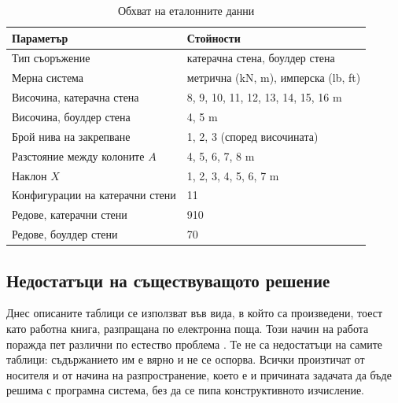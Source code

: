 \begin{table}[htbp]
\centering
\caption{Обхват на еталонните данни}
\label{tab:params}
{\fontsize{10}{12}\selectfont
\begin{tabular}{@{}L{5.6cm}L{7.4cm}@{}}
\toprule
\textbf{Параметър} & \textbf{Стойности} \\
\midrule
Тип съоръжение & катерачна стена, боулдер стена \\
Мерна система & метрична (kN, m), имперска (lb, ft) \\
Височина, катерачна стена & 8, 9, 10, 11, 12, 13, 14, 15, 16 m \\
Височина, боулдер стена & 4, 5 m \\
Брой нива на закрепване & 1, 2, 3 (според височината) \\
Разстояние между колоните $A$ & 4, 5, 6, 7, 8 m \\
Наклон $X$ & 1, 2, 3, 4, 5, 6, 7 m \\
Конфигурации на катерачни стени & 11 \\
Редове, катерачни стени & 910 \\
Редове, боулдер стени & 70 \\
\bottomrule
\end{tabular}}
\end{table}

\subsection{Недостатъци на съществуващото решение}
\label{subsec:asis}

Днес описаните таблици се използват във вида, в който са произведени, тоест като
работна книга, разпращана по електронна поща. Този начин на работа поражда пет
различни по естество проблема . Те не са недостатъци на самите
таблици: съдържанието им е вярно и не се оспорва. Всички произтичат от носителя и
от начина на разпространение, което е и причината задачата да бъде решима с програмна
система, без да се пипа конструктивното изчисление.

